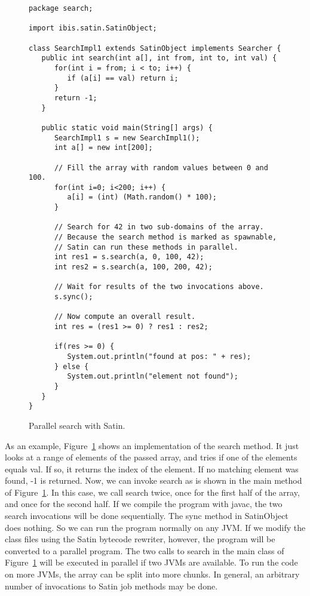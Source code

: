 \documentclass[10pt]{article}
\begin{document}
\begin{figure}[t!]
{\small
\begin{verbatim}
package search;

import ibis.satin.SatinObject;

class SearchImpl1 extends SatinObject implements Searcher {
   public int search(int a[], int from, int to, int val) {
      for(int i = from; i < to; i++) {
         if (a[i] == val) return i;
      }
      return -1;
   }

   public static void main(String[] args) {
      SearchImpl1 s = new SearchImpl1();
      int a[] = new int[200];

      // Fill the array with random values between 0 and 100.
      for(int i=0; i<200; i++) {
         a[i] = (int) (Math.random() * 100);
      }

      // Search for 42 in two sub-domains of the array.
      // Because the search method is marked as spawnable,
      // Satin can run these methods in parallel.
      int res1 = s.search(a, 0, 100, 42);
      int res2 = s.search(a, 100, 200, 42);

      // Wait for results of the two invocations above.
      s.sync();

      // Now compute an overall result.
      int res = (res1 >= 0) ? res1 : res2;

      if(res >= 0) {
         System.out.println("found at pos: " + res);
      } else {
         System.out.println("element not found");
      }
   }
}
\end{verbatim}
}
\caption{Parallel search with Satin.}
\label{satin-search-fig}
\end{figure}

As an example, Figure~\ref{satin-search-fig} shows an implementation of the search
method. It just looks at a range of elements of the passed array, and
tries if one of the elements equals val. If so, it returns the index
of the element. If no matching element was found, -1 is returned.
Now, we can invoke search as is shown in the main method of Figure~\ref{satin-search-fig}.
In this case, we call search twice, once for the first half of the
array, and once for the second half. If we compile the program with
javac, the two search invocations will be done sequentially. The sync
method in SatinObject does nothing. So we can run the program normally
on any JVM.  If we modify the class files using the Satin bytecode
rewriter, however, the program will be converted to a parallel
program.  The two calls to search in the main class of Figure~\ref{satin-search-fig} will
be executed in parallel if two JVMs are available. To run the code on
more JVMs, the array can be split into more chunks. In general, an
arbitrary number of invocations to Satin job methods may be done.
\end{document}

